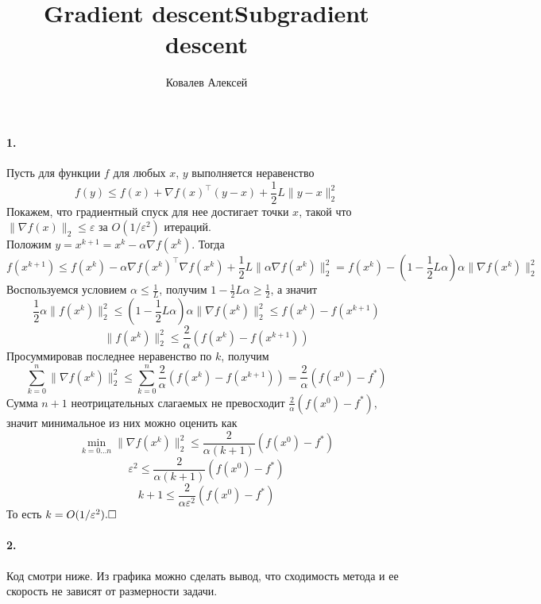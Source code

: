 \documentclass{article}
\title{Gradient descent}
\author{Ковалев Алексей}
\date{}
\newcommand*{\QED}{\null\nobreak\hfill\ensuremath{\square}}
\begin{document}
\maketitle

\paragraph{1.} Пусть для функции $f$ для любых $x$, $y$ выполняется неравенство
\[ f(y) \leqslant f(x) + \nabla f(x)^\top (y - x) + \frac12 L \| y - x \|_2^2 \]
Покажем, что градиентный спуск для нее достигает точки $x$, такой что $\| \nabla f(x) \|_2 \leqslant \varepsilon$ за $ O(1/\varepsilon^2) $ итераций. \\
Положим $ y = x^{k + 1} = x^k - \alpha \nabla f(x^k) $. Тогда
\[ f(x^{k + 1}) \leqslant f(x^k) - \alpha \nabla f(x^k)^\top \nabla f(x^k) + \frac12 L \| \alpha \nabla f(x^k) \|_2^2 = f(x^k) - \left( 1 - \frac12 L \alpha \right) \alpha \| \nabla f(x^k) \|_2^2 \]
Воспользуемся условием $\alpha \leqslant \frac{1}{L}$, получим $1 - \frac12 L \alpha \geqslant \frac12$, а значит
\[ \frac12 \alpha \| f(x^k) \|_2^2 \leqslant \left( 1 - \frac12 L \alpha \right) \alpha \| \nabla f(x^k) \|_2^2 \leqslant f(x^k) - f(x^{k + 1}) \]
\[ \| f(x^k) \|_2^2 \leqslant \frac{2}{\alpha} \left( f(x^k) - f(x^{k + 1}) \right) \]
Просуммировав последнее неравенство по $k$, получим
\[ \sum_{k = 0}^n \| \nabla f(x^k) \|_2^2 \leqslant \sum_{k = 0}^n \frac{2}{\alpha} \left( f(x^k) - f(x^{k + 1}) \right) = \frac{2}{\alpha} \left( f(x^0) - f^\ast \right) \]
Сумма $n + 1$ неотрицательных слагаемых не превосходит $\frac{2}{\alpha} \left( f(x^0) - f^\ast \right)$, значит минимальное из них можно оценить как
\[ \min_{k = 0 \dotsc n} \| \nabla f(x^k) \|_2^2 \leqslant \frac{2}{\alpha (k + 1)} \left( f(x^0) - f^\ast \right) \]
\[ \varepsilon^2 \leqslant \frac{2}{\alpha (k + 1)} \left( f(x^0) - f^\ast \right) \]
\[ k + 1 \leqslant \frac{2}{\alpha \varepsilon^2} \left( f(x^0) - f^\ast \right) \]
То есть $k = O(1/\varepsilon^2). \QED $


\paragraph{2.} Код смотри ниже. Из графика можно сделать вывод, что сходимость метода и ее скорость не зависят от размерности задачи.


\title{Subgradient descent}
\maketitle
\end{document}
